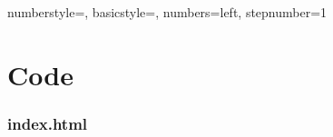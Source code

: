 \lstset
{
	numberstyle=\footnotesize,
	basicstyle=\ttfamily\footnotesize,
	numbers=left,
	stepnumber=1
}

\part{Code}
	\setcounter{chapter}{0}
	
	
	
	
	
	
	
	\section{index.html}
	
	
	
